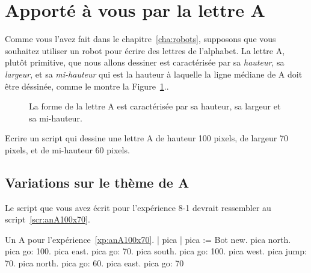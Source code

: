 \documentclass[a4paper,10pt,twoside]{book}
\begin{document}
\section{Apport\'e \`a vous par la lettre A } 

Comme vous l'avez fait dans le chapitre~\ref{cha:robots}, supposons que vous souhaitez utiliser un robot pour \'ecrire des lettres de l'alphabet. La lettre A, plut\^ot primitive, que nous allons dessiner est caract\'eris\'ee par sa \emph{hauteur}, sa \emph{largeur}, et sa \emph{mi-hauteur} qui est la hauteur \`a laquelle la ligne m\'ediane de  A doit \^etre d\'essin\'ee, comme le montre la Figure~\ref{fig:varannotated}.. 

\begin{figure}
\caption{La forme de la lettre A est caract\'eris\'ee par sa hauteur, sa largeur et sa mi-hauteur. \label{fig:varannotated}}
\end{figure}

\begin{exonofig}\label{xp:anA100x70}
Ecrire un script qui dessine une lettre A de hauteur 100 pixels, de largeur 70 pixels, et de mi-hauteur 60 pixels. 
\end{exonofig}


\subsection{Variations sur le th\`eme de A} 

Le script que vous avez \'ecrit pour l'exp\'erience 8-1 devrait ressembler au script~\ref{scr:anA100x70}.  

\begin{script}[anA100x70]{Un A pour l'exp\'erience~\ref{xp:anA100x70}.}
| pica | 
pica := Bot new. 
pica north. 
pica go: 100. 
pica east. 
pica go: 70. 
pica south. 
pica go: 100. 
pica west. 
pica jump: 70. 
pica north. 
pica go: 60. 
pica east. 
pica go: 70 
\end{script}
\end{document}
